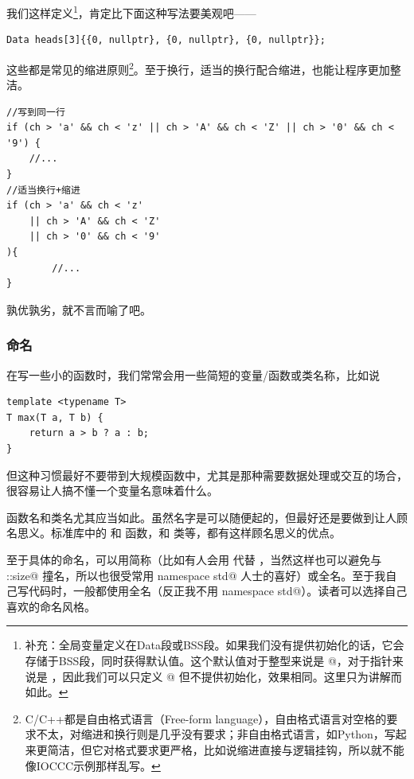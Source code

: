 我们这样定义\footnote{补充：全局变量定义在Data段或BSS段。如果我们没有提供初始化的话，它会存储于BSS段，同时获得默认值。这个默认值对于整型来说是 @，对于指针来说是 \lstinline@nullptr@，因此我们可以只定义 \lstinline@heads[3]@ 但不提供初始化，效果相同。这里只为讲解而如此。}，肯定比下面这种写法要美观吧——
\begin{lstlisting}
Data heads[3]{{0, nullptr}, {0, nullptr}, {0, nullptr}};
\end{lstlisting}\par
这些都是常见的缩进原则\footnote{C/C++都是自由格式语言（Free-form language），自由格式语言对空格的要求不太，对缩进和换行则是几乎没有要求；非自由格式语言，如Python，写起来更简洁，但它对格式要求更严格，比如说缩进直接与逻辑挂钩，所以就不能像IOCCC示例那样乱写。}。至于换行，适当的换行配合缩进，也能让程序更加整洁。
\begin{lstlisting}
//写到同一行
if (ch > 'a' && ch < 'z' || ch > 'A' && ch < 'Z' || ch > '0' && ch < '9') {
    //...
}
//适当换行+缩进
if (ch > 'a' && ch < 'z'
    || ch > 'A' && ch < 'Z'
    || ch > '0' && ch < '9'
){
        //...
}
\end{lstlisting}
孰优孰劣，就不言而喻了吧。\par
\subsubsection*{命名}
在写一些小的函数时，我们常常会用一些简短的变量/函数或类名称，比如说
\begin{lstlisting}
template <typename T>
T max(T a, T b) {
    return a > b ? a : b;
}
\end{lstlisting}
但这种习惯最好不要带到大规模函数中，尤其是那种需要数据处理或交互的场合，很容易让人搞不懂一个变量名意味着什么。\par
函数名和类名尤其应当如此。虽然名字是可以随便起的，但最好还是要做到让人顾名思义。标准库中的 \lstinline@max@ 和 \lstinline@strlen@ 函数，\lstinline@string@ 和 \lstinline@list@ 类等，都有这样顾名思义的优点。\par
至于具体的命名，可以用简称（比如有人会用 \lstinline@siz@ 代替 \lstinline@size@，当然这样也可以避免与 \lstinline@std::size@ 撞名，所以也很受常用 \lstinline@using namespace std@ 人士的喜好）或全名。至于我自己写代码时，一般都使用全名（反正我不用 \lstinline@using namespace std@）。读者可以选择自己喜欢的命名风格。
